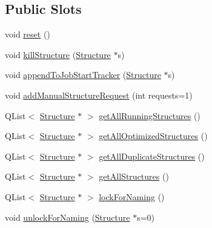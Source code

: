 \subsection*{Public Slots}
\begin{DoxyCompactItemize}
\item 
void \hyperlink{classGlobalSearch_1_1QueueManager_a36c7fd5b33bd74babfd68ee746e5017c}{reset} ()
\item 
void \hyperlink{classGlobalSearch_1_1QueueManager_aa79f26f791ec8315f2ae36d820bfa0ac}{kill\+Structure} (\hyperlink{classGlobalSearch_1_1Structure}{Structure} $\ast$s)
\item 
void \hyperlink{classGlobalSearch_1_1QueueManager_aa010ca43a5ec0c5ce653c4ab5bfebb27}{append\+To\+Job\+Start\+Tracker} (\hyperlink{classGlobalSearch_1_1Structure}{Structure} $\ast$s)
\item 
void \hyperlink{classGlobalSearch_1_1QueueManager_ab04255999ca9a52f471b37141e9e3f6e}{add\+Manual\+Structure\+Request} (int requests=1)
\item 
Q\+List$<$ \hyperlink{classGlobalSearch_1_1Structure}{Structure} $\ast$ $>$ \hyperlink{classGlobalSearch_1_1QueueManager_abb5985273cbb0126bf065acb76c2be51}{get\+All\+Running\+Structures} ()
\item 
Q\+List$<$ \hyperlink{classGlobalSearch_1_1Structure}{Structure} $\ast$ $>$ \hyperlink{classGlobalSearch_1_1QueueManager_a05ab94e45df60fb8c9078fbf81a2d80c}{get\+All\+Optimized\+Structures} ()
\item 
Q\+List$<$ \hyperlink{classGlobalSearch_1_1Structure}{Structure} $\ast$ $>$ \hyperlink{classGlobalSearch_1_1QueueManager_a14ab987c7a7939e27ba84010e9943bdd}{get\+All\+Duplicate\+Structures} ()
\item 
Q\+List$<$ \hyperlink{classGlobalSearch_1_1Structure}{Structure} $\ast$ $>$ \hyperlink{classGlobalSearch_1_1QueueManager_ad77db239019da90a79040b680f2398dc}{get\+All\+Structures} ()
\item 
Q\+List$<$ \hyperlink{classGlobalSearch_1_1Structure}{Structure} $\ast$ $>$ \hyperlink{classGlobalSearch_1_1QueueManager_a11aa65d1cc9c13424a8eac1c08fe9c0b}{lock\+For\+Naming} ()
\item 
void \hyperlink{classGlobalSearch_1_1QueueManager_a5f8012e4b5d002c444bfc486084feec1}{unlock\+For\+Naming} (\hyperlink{classGlobalSearch_1_1Structure}{Structure} $\ast$s=0)
\end{DoxyCompactItemize}
